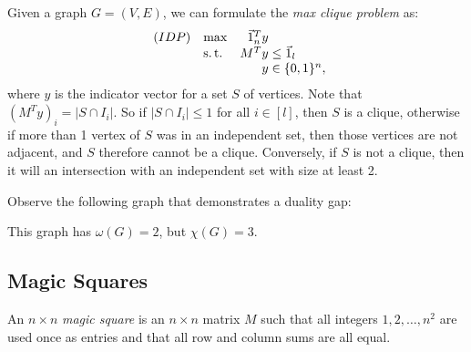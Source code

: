 \begin{defn}
    \label{def:max-clique-formulation}
    Given a graph $G = (V,E)$, we can formulate the \textit{max clique problem} as:
        \begin{equation*}
            \begin{array}{llr@{}l@{}}
                (IDP)   & \max  &   \one_n^T y  &               \\
                        & \st   &       M^T y   &{}\le \one_l   \\
                        &       &       y       &{}\in \{0,1\}^n,
            \end{array}
        \end{equation*}
    where $y$ is the indicator vector for a set $S$ of vertices. Note that $(M^T y)_i = |S \cap I_i|$. So if $|S \cap I_i| \le 1$ for all $i \in [l]$, then $S$ is a clique, otherwise if more than 1 vertex of $S$ was in an independent set, then those vertices are not adjacent, and $S$ therefore cannot be a clique. Conversely, if $S$ is not a clique, then it will an intersection with an independent set with size at least 2.
\end{defn}

\begin{exm}
    Observe the following graph that demonstrates a duality gap:
    \begin{center}
    \end{center}
    
    This graph has $\omega(G) = 2$, but $\chi(G) = 3$.
\end{exm}


\subsection{Magic Squares}
\label{subsec:magic-squares}

\begin{defn}
    \label{def:magic-square}
    An $n \times n$ \textit{magic square} is an $n \times n $ matrix $M$ such that all integers $1, 2, \dots, n^2$ are used once as entries and that all row and column sums are all equal.
\end{defn}

